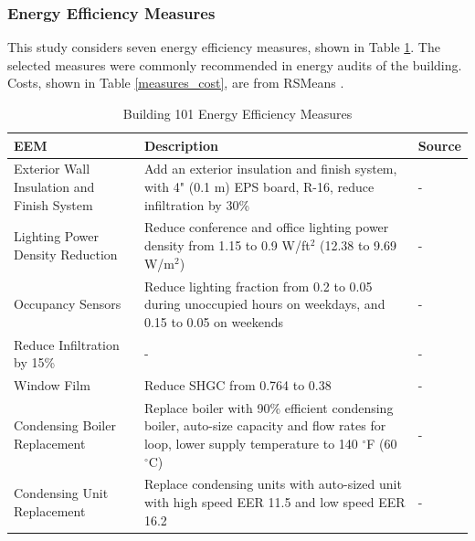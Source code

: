 \documentclass[review]{elsarticle}
\begin{document}
\subsubsection{Energy Efficiency Measures}
This study considers seven energy efficiency measures, shown in Table \ref{measures}.  The selected measures were commonly recommended in energy audits of the building.  Costs, shown in Table \ref{measures_cost}, are from RSMeans \cite{RSmeans2014}.

\begin{table}[h]
	\centering
	\begin{tabular}{|p{3cm}|p{8cm}|p{1cm}|}
		\hline
		\textbf{EEM} & \textbf{Description} & \textbf{Source} \\
		\hline
		Exterior Wall Insulation and Finish System & Add an exterior insulation and finish system, with 4" (0.1 m) EPS board, R-16, reduce infiltration by 30\% & - \\
		\hline
		Lighting Power Density Reduction & Reduce conference and office lighting power density from 1.15 to 0.9 W/ft$^2$ (12.38 to 9.69 W/m$^2$) & - \\
		\hline
		Occupancy Sensors & Reduce lighting fraction from 0.2 to 0.05 during unoccupied hours on weekdays, and 0.15 to 0.05 on weekends & - \\
		\hline
		Reduce Infiltration by 15\% & - & - \\
		\hline
		Window Film & Reduce SHGC from 0.764 to 0.38 & - \\
		\hline
		Condensing Boiler Replacement & Replace boiler with 90\% efficient condensing boiler, auto-size capacity and flow rates for loop, lower supply temperature to 140 $^{\circ}$F (60 $^{\circ}$C) & - \\
		\hline
		Condensing Unit Replacement & Replace condensing units with auto-sized unit with high speed EER 11.5 and low speed EER 16.2 & - \\
		\hline
	\end{tabular}
	\caption{Building 101 Energy Efficiency Measures}
	\label{measures}
\end{table}
\end{document}
